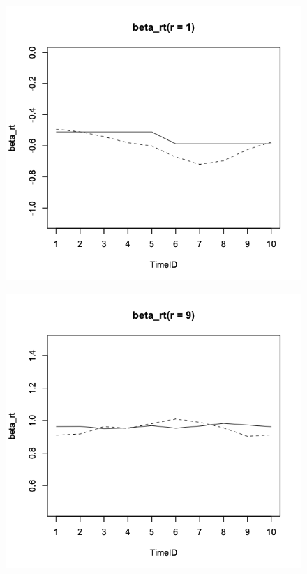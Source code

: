 \documentclass[a4paper,11pt,oneside,openany]{jsbook}
\begin{document}
\begin{figure}[]
 \begin{minipage}[tb]{0.3\linewidth}
  \centering
  \includegraphics[keepaspectratio,scale=0.25]{img/beta_rt_param_1.png}
  \label{ICC1}
 \end{minipage}
 \begin{minipage}[tb]{0.3\linewidth}
  \centering
  \includegraphics[keepaspectratio,scale=0.25]{img/beta_rt_param_9.png}

\end{minipage}
\end{figure}
\end{document}
